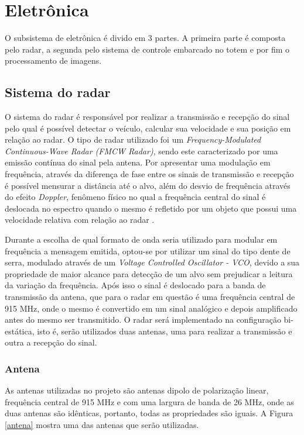 \chapter{Eletrônica}

O subsistema de eletrônica é divido em 3 partes. A primeira parte é composta pelo radar, a segunda pelo sistema de controle embarcado no totem e por fim o processamento de imagens. 


\section{Sistema do radar}
O sistema do radar é responsável por realizar a transmissão e recepção do sinal pelo qual é possível detectar o veículo, calcular sua velocidade e sua posição em relação ao radar.
O tipo de radar utilizado foi um \emph{Frequency-Modulated Continuous-Wave Radar (FMCW Radar)}, sendo este caracterizado por uma emissão contínua do sinal pela antena. Por apresentar uma modulação em frequência, através da diferença de fase entre os sinais de transmissão e recepção é possível mensurar a distância até o alvo, além do desvio de frequência através do efeito \emph{Doppler}, fenômeno físico no qual a frequência central do sinal é deslocada no espectro quando o mesmo é refletido por um objeto que possui uma velocidade relativa com relação ao radar \cite{Doppler}.

Durante a escolha de qual formato de onda seria utilizado para modular em frequência a mensagem emitida, optou-se por utilizar um sinal do tipo dente de serra, modulado através de um \emph{Voltage Controlled Oscillator - VCO}, devido a sua propriedade de maior alcance para detecção de um alvo sem prejudicar a leitura da variação da frequência.
Após isso o sinal é deslocado para a banda de transmissão da antena, que para o radar em questão é uma frequência central de 915 MHz, onde o mesmo é convertido em um sinal analógico e depois amplificado antes do mesmo ser transmitido.
O radar será implementado na configuração bi-estática, isto é, serão utilizados duas antenas, uma para realizar a transmissão e outra a recepção do sinal\cite{GNURadio}. 

\subsection{Antena}

As antenas utilizadas no projeto são antenas dipolo de polarização linear, frequência central de 915 MHz e com uma largura de banda de 26 MHz, onde as duas antenas são idênticas, portanto, todas as propriedades são iguais. A Figura \ref{antena} mostra uma das antenas que serão utilizadas. 

